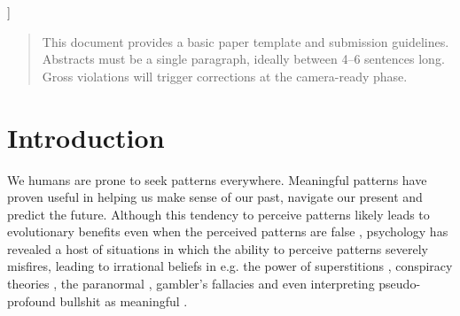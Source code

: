 \documentclass{article}
\theoremstyle{plain}
\theoremstyle{definition}
\theoremstyle{remark}
\begin{document}
\vskip 0.3in
]



\printAffiliationsAndNotice{\icmlEqualContribution} %

\begin{abstract}
This document provides a basic paper template and submission guidelines.
Abstracts must be a single paragraph, ideally between 4--6 sentences long.
Gross violations will trigger corrections at the camera-ready phase.
\end{abstract}

\section{Introduction}
\label{submission}

We humans are prone to seek patterns everywhere. Meaningful patterns have proven useful in helping us make sense of our past, navigate our present and predict the future. Although this tendency to perceive patterns likely leads to evolutionary benefits even when the perceived patterns are false \cite{foster2009evolution}, psychology has revealed a host of situations in which the ability to perceive patterns severely misfires, leading to irrational beliefs in e.g. the power of superstitions \cite{foster2009evolution}, conspiracy theories \cite{van2018connecting}, the paranormal \cite{muller2023linking}, gambler's fallacies \cite{ladouceur1996erroneous} and even interpreting pseudo-profound bullshit as meaningful \cite{walker2019finding}. 
\end{document}
